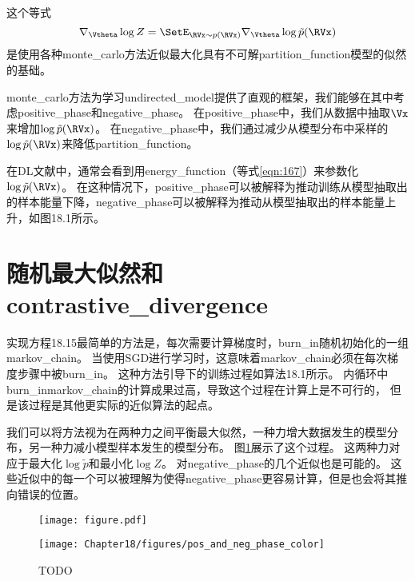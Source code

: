 这个等式
\begin{equation}
	\nabla_{\Vtheta} \log Z = \SetE_{\RVx \sim p(\RVx)} \nabla_{\Vtheta} \log \tilde{p}(\RVx)
\end{equation}
是使用各种\gls{monte_carlo}方法近似最大化具有不可解\gls{partition_function}模型的似然的基础。


\gls{monte_carlo}方法为学习\gls{undirected_model}提供了直观的框架，我们能够在其中考虑\gls{positive_phase}和\gls{negative_phase}。
在\gls{positive_phase}中，我们从数据中抽取$\Vx$来增加$\log \tilde{p}(\RVx)$。
在\gls{negative_phase}中，我们通过减少从模型分布中采样的$\log \tilde{p}(\RVx)$来降低\gls{partition_function}。


在\gls{DL}文献中，通常会看到用\gls{energy_function}（等式\ref{eqn:167}）来参数化$\log \tilde{p}(\RVx)$。
在这种情况下，\gls{positive_phase}可以被解释为推动训练从模型抽取出的样本能量下降，\gls{negative_phase}可以被解释为推动从模型抽取出的样本能量上升，如图18.1所示。


\section{随机最大似然和\gls{contrastive_divergence}}
\label{sec:stochastic_maximum_likelihood_and_contrastive_divergence}
实现方程18.15最简单的方法是，每次需要计算梯度时，\gls{burn_in}随机初始化的一组\gls{markov_chain}。
当使用\gls{SGD}进行学习时，这意味着\gls{markov_chain}必须在每次梯度步骤中被\gls{burn_in}。
这种方法引导下的训练过程如算法18.1所示。
内循环中\gls{burn_in}\gls{markov_chain}的计算成果过高，导致这个过程在计算上是不可行的，
但是该过程是其他更实际的近似算法的起点。


我们可以将方法视为在两种力之间平衡最大似然，一种力增大数据发生的模型分布，另一种力减小模型样本发生的模型分布。
图\ref{fig:chap18_pos_and_neg_phase}展示了这个过程。
这两种力对应于最大化$\log \tilde{p}$和最小化$\log Z$。
对\gls{negative_phase}的几个近似也是可能的。
这些近似中的每一个可以被理解为使得\gls{negative_phase}更容易计算，但是也会将其推向错误的位置。

\begin{figure}[!htb]
\ifOpenSource
\centerline{\texttt{[image: figure.pdf]}}
\else
\centerline{\texttt{[image: Chapter18/figures/pos\_and\_neg\_phase\_color]}}
\fi
\caption{TODO}
\label{fig:chap18_pos_and_neg_phase}
\end{figure}


